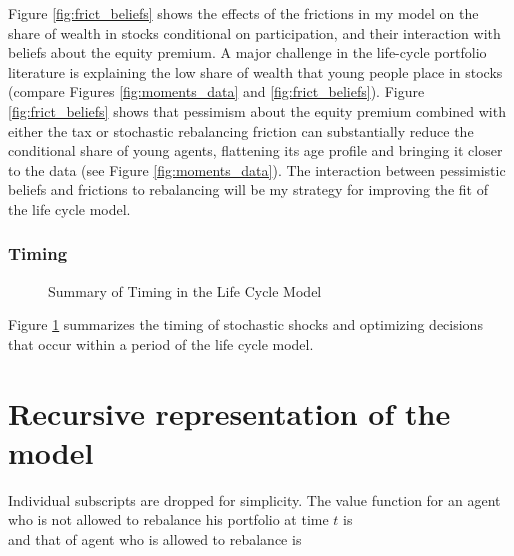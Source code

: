 \documentclass[./RiskyContrib.tex]{subfiles}
\begin{document}
Figure \ref{fig:frict_beliefs} shows the effects of the frictions in my model
on the share of wealth in stocks conditional on participation, and their
interaction with beliefs about the equity premium. A major challenge in the
life-cycle portfolio literature is explaining the low share of wealth that
young people place in stocks (compare Figures \ref{fig:moments_data} and
\ref{fig:frict_beliefs}). Figure \ref{fig:frict_beliefs} shows that pessimism
about the equity premium combined with either the tax or stochastic rebalancing
friction can substantially reduce the conditional share of young agents, flattening
its age profile and bringing it closer to the data
(see Figure \ref{fig:moments_data}). The interaction between pessimistic beliefs
and frictions to rebalancing will be my strategy for improving the fit of the
life cycle model.

\subsubsection{Timing}

\begin{figure}

\begin{center}
%
\caption{Summary of Timing in the Life Cycle Model}\label{fig:timing_diagram}
\end{center}
\end{figure}

Figure \ref{fig:timing_diagram} summarizes the timing of stochastic shocks and
optimizing decisions that occur within a period of the life cycle model.

\hypertarget{Recursive}{}
\section{Recursive representation of the model}


Individual subscripts are dropped for simplicity. The value function for
an agent who is not allowed to rebalance his portfolio at time $t$ is
\begin{equation*}
    
\end{equation*}
and that of agent who is allowed to rebalance is
\begin{equation*}
    
\end{equation*}
\end{document}
